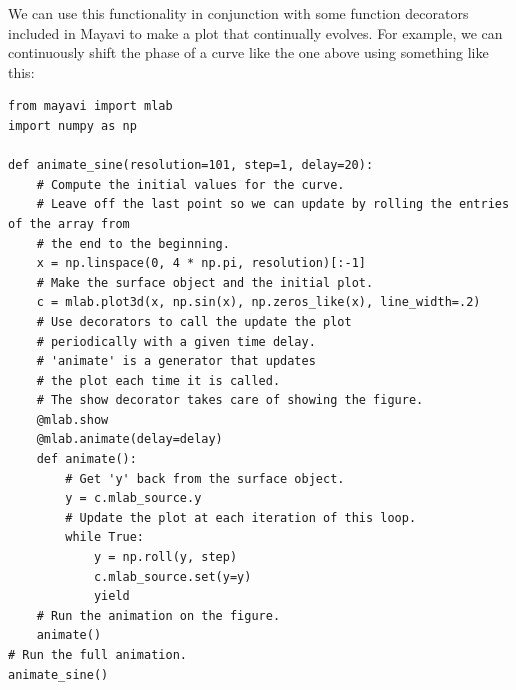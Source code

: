 We can use this functionality in conjunction with some function decorators included in Mayavi to make a plot that continually evolves.
For example, we can continuously shift the phase of a curve like the one above using something like this:
\begin{lstlisting}
from mayavi import mlab
import numpy as np

def animate_sine(resolution=101, step=1, delay=20):
    # Compute the initial values for the curve.
    # Leave off the last point so we can update by rolling the entries of the array from
    # the end to the beginning.
    x = np.linspace(0, 4 * np.pi, resolution)[:-1]
    # Make the surface object and the initial plot.
    c = mlab.plot3d(x, np.sin(x), np.zeros_like(x), line_width=.2)
    # Use decorators to call the update the plot
    # periodically with a given time delay.
    # 'animate' is a generator that updates
    # the plot each time it is called.
    # The show decorator takes care of showing the figure.
    @mlab.show
    @mlab.animate(delay=delay)
    def animate():
        # Get 'y' back from the surface object.
        y = c.mlab_source.y
        # Update the plot at each iteration of this loop.
        while True:
            y = np.roll(y, step)
            c.mlab_source.set(y=y)
            yield
    # Run the animation on the figure.
    animate()
# Run the full animation.
animate_sine()
\end{lstlisting}

